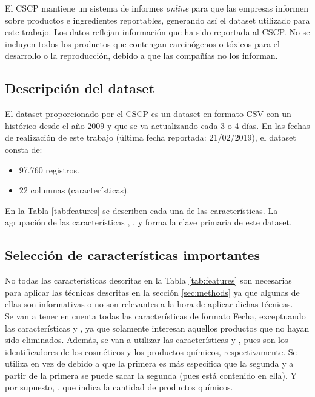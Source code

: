 El CSCP mantiene un sistema de informes \textit{online} para que las empresas informen sobre productos e ingredientes reportables, generando así el dataset utilizado para este trabajo. Los datos reflejan información que ha sido reportada al CSCP. No se incluyen todos los productos que contengan carcinógenos o tóxicos para el desarrollo o la reproducción, debido a que las compañías no los informan.



\subsection{Descripción del dataset}
\label{sec:dataset-description}

El dataset proporcionado por el CSCP es un dataset en formato CSV con un histórico desde el año 2009 y que se va actualizando cada 3 o 4 días. En las fechas de realización de este trabajo (última fecha reportada: 21/02/2019), el dataset consta de:

\begin{itemize}
 \item 97.760 registros.
 \item 22 columnas (características).
\end{itemize}

En la Tabla \ref{tab:features} se describen cada una de las características. La agrupación de las características , ,  y  forma la clave primaria de este dataset.


\subsection{Selección de características importantes}

No todas las características descritas en la Tabla \ref{tab:features} son necesarias para aplicar las técnicas descritas en la sección \ref{sec:methods} ya que algunas de ellas son informativas o no son relevantes a la hora de aplicar dichas técnicas. \\

Se van a tener en cuenta todas las características de formato Fecha, exceptuando las características  y , ya que solamente interesan aquellos productos que no hayan sido eliminados. Además, se van a utilizar las características  y , pues son los identificadores de los cosméticos y los productos químicos, respectivamente. Se utiliza  en vez de  debido a que la primera es más específica que la segunda y a partir de la primera se puede sacar la segunda (pues está contenido en ella). Y por supuesto, , que indica la cantidad de productos químicos. \\


